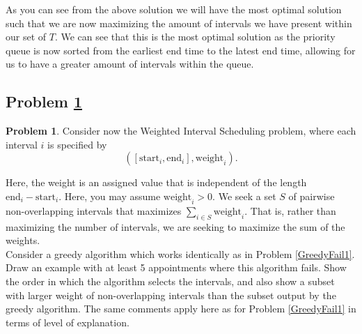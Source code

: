 \documentclass[11pt]{article}
\theoremstyle{definition}
\theoremstyle{definition}
\newtheorem{required}{Problem}
\theoremstyle{definition}
\begin{document}
As you can see from the above solution we will have the most optimal solution such that we are now maximizing the amount of intervals we have present within our set of $T$. We can see that this is the most optimal solution as the priority queue is now sorted from the earliest end time to the latest end time, allowing for us to have a greater amount of intervals within the queue. 



\newpage
\subsection{Problem \ref{GreedyFail3}}
\begin{required} \label{GreedyFail3}
Consider now the \textsf{Weighted Interval Scheduling} problem, where each interval $i$ is specified by 
\[
([\text{start}_{i}, \text{end}_{i}], \text{weight}_{i}). 
\]

\noindent Here, the weight is an assigned value that is independent of the length $\text{end}_{i} - \text{start}_{i}$. Here, you may assume $\text{weight}_{i} > 0$. We seek a set $S$ of pairwise non-overlapping intervals that maximizes $\sum_{i \in S} \text{weight}_{i}$. That is, rather than maximizing the number of intervals, we are seeking to maximize the sum of the weights. \\

\noindent Consider a greedy algorithm which works identically as in Problem \ref{GreedyFail1}. Draw an example with at least 5 appointments where this algorithm fails. Show the order in which the algorithm selects the intervals, and also show a subset with larger weight of non-overlapping intervals than the subset output by the greedy algorithm. The same comments apply here as for Problem \ref{GreedyFail1} in terms of level of explanation.
\end{required}
\end{document}
